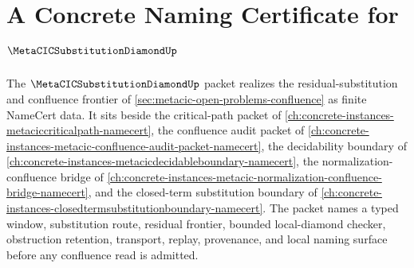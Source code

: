 \chapter{A Concrete Naming Certificate for $\MetaCICSubstitutionDiamondUp$}
\label{ch:concrete-instances-metacic-substitution-diamond-namecert}

The $\MetaCICSubstitutionDiamondUp$ packet realizes the residual-substitution and confluence frontier of \autoref{sec:metacic-open-problems-confluence} as finite NameCert data. It sits beside the critical-path packet of \autoref{ch:concrete-instances-metaciccriticalpath-namecert}, the confluence audit packet of \autoref{ch:concrete-instances-metacic-confluence-audit-packet-namecert}, the decidability boundary of \autoref{ch:concrete-instances-metacicdecidableboundary-namecert}, the normalization-confluence bridge of \autoref{ch:concrete-instances-metacic-normalization-confluence-bridge-namecert}, and the closed-term substitution boundary of \autoref{ch:concrete-instances-closedtermsubstitutionboundary-namecert}. The packet names a typed window, substitution route, residual frontier, bounded local-diamond checker, obstruction retention, transport, replay, provenance, and local naming surface before any confluence read is admitted.



